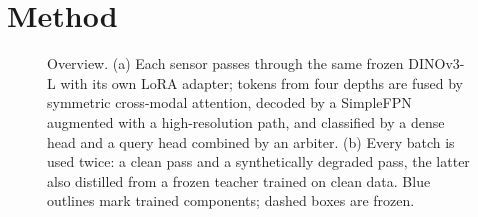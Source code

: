 \section{Method}\label{sec:method}

\begin{figure}[t]
\centering
\resizebox{\textwidth}{!}{}
\caption{Overview. (a) Each sensor passes through the same frozen DINOv3-L with its own LoRA adapter; tokens from four depths are fused by symmetric cross-modal attention, decoded by a SimpleFPN augmented with a high-resolution path, and classified by a dense head and a query head combined by an arbiter. (b) Every batch is used twice: a clean pass and a synthetically degraded pass, the latter also distilled from a frozen teacher trained on clean data. Blue outlines mark trained components; dashed boxes are frozen. }
\label{fig:arch}
\end{figure}
